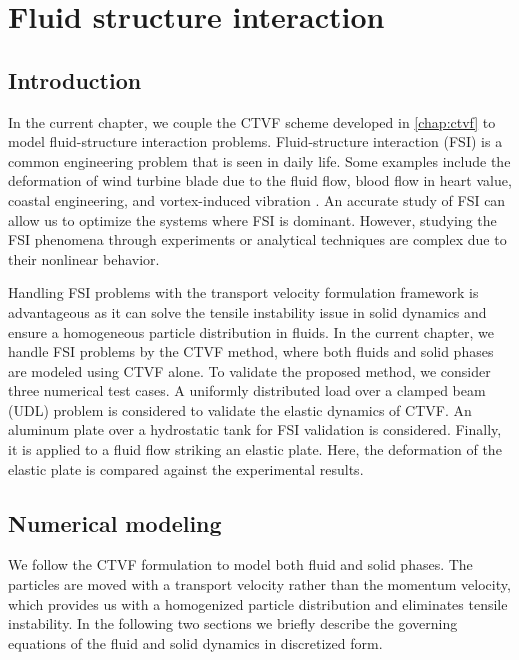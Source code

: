 \chapter{Fluid structure interaction}\label{chap:fsi}
\section{Introduction}
In the current chapter, we couple the CTVF scheme developed in \cref{chap:ctvf}
to model fluid-structure interaction problems. Fluid-structure interaction (FSI)
is a common engineering problem that is seen in daily life. Some examples
include the deformation of wind turbine blade due to the fluid flow, blood flow
in heart value, coastal engineering, and vortex-induced vibration
\citep{williamson2004vortex,bearman2011circular}. An accurate study of FSI can
allow us to optimize the systems where FSI is dominant. However, studying the
FSI phenomena through experiments or analytical techniques are complex due to
their nonlinear behavior.

Handling FSI problems with the transport velocity formulation framework is
advantageous as it can solve the tensile instability issue in solid dynamics and
ensure a homogeneous particle distribution in fluids. In the current chapter, we handle
FSI problems by the CTVF method, where both fluids and solid phases are modeled
using CTVF alone. To validate the proposed method, we consider three numerical
test cases. A uniformly distributed load over a clamped beam (UDL) problem is
considered to validate the elastic dynamics of CTVF. An aluminum plate over a
hydrostatic tank for FSI validation is considered. Finally, it is applied to a
fluid flow striking an elastic plate. Here, the deformation of the elastic plate
is compared against the experimental results.

\section{Numerical modeling}\label{sec2}
We follow the CTVF formulation to model both fluid and solid phases. The
particles are moved with a transport velocity rather than the momentum velocity,
which provides us with a homogenized particle distribution and eliminates
tensile instability. In the following two sections we briefly describe the
governing equations of the fluid and solid dynamics in discretized form.


